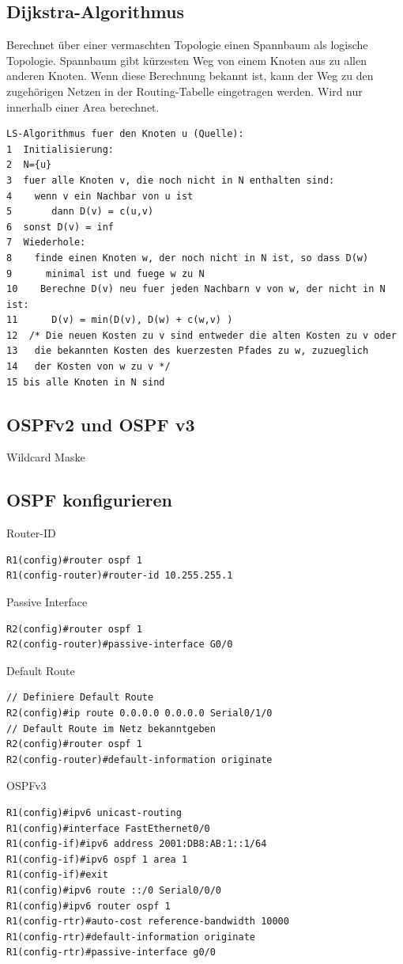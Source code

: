 \documentclass[a4paper,12pt]{article}
\begin{document}
\subsection{Dijkstra-Algorithmus}
Berechnet über einer vermaschten Topologie einen Spannbaum als logische Topologie. Spannbaum gibt kürzesten Weg von einem Knoten aus zu allen anderen Knoten. Wenn diese Berechnung bekannt ist, kann der Weg zu den zugehörigen Netzen in der Routing-Tabelle eingetragen werden. Wird nur innerhalb einer Area berechnet.
\begin{lstlisting}
LS-Algorithmus fuer den Knoten u (Quelle):
1  Initialisierung:
2  N={u}
3  fuer alle Knoten v, die noch nicht in N enthalten sind:
4    wenn v ein Nachbar von u ist
5       dann D(v) = c(u,v)
6  sonst D(v) = inf
7  Wiederhole:
8    finde einen Knoten w, der noch nicht in N ist, so dass D(w)
9      minimal ist und fuege w zu N
10    Berechne D(v) neu fuer jeden Nachbarn v von w, der nicht in N ist:
11      D(v) = min(D(v), D(w) + c(w,v) )
12  /* Die neuen Kosten zu v sind entweder die alten Kosten zu v oder
13   die bekannten Kosten des kuerzesten Pfades zu w, zuzueglich
14   der Kosten von w zu v */
15 bis alle Knoten in N sind
\end{lstlisting}

\subsection{OSPFv2 und OSPF v3}
Wildcard Maske

\subsection{OSPF konfigurieren}
Router-ID
\begin{lstlisting}
R1(config)#router ospf 1
R1(config-router)#router-id 10.255.255.1
\end{lstlisting}

Passive Interface
\begin{lstlisting}
R2(config)#router ospf 1
R2(config-router)#passive-interface G0/0
\end{lstlisting}

Default Route
\begin{lstlisting}
// Definiere Default Route
R2(config)#ip route 0.0.0.0 0.0.0.0 Serial0/1/0
// Default Route im Netz bekanntgeben
R2(config)#router ospf 1
R2(config-router)#default-information originate
\end{lstlisting}

OSPFv3
\begin{lstlisting}
R1(config)#ipv6 unicast-routing
R1(config)#interface FastEthernet0/0
R1(config-if)#ipv6 address 2001:DB8:AB:1::1/64
R1(config-if)#ipv6 ospf 1 area 1
R1(config-if)#exit
R1(config)#ipv6 route ::/0 Serial0/0/0
R1(config)#ipv6 router ospf 1
R1(config-rtr)#auto-cost reference-bandwidth 10000
R1(config-rtr)#default-information originate
R1(config-rtr)#passive-interface g0/0
\end{lstlisting}
\end{document}
